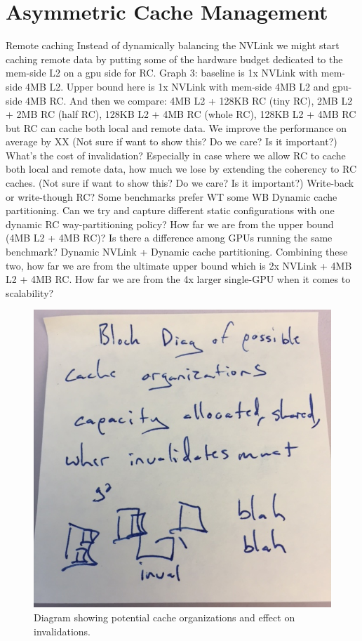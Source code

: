 \section{Asymmetric Cache Management}

Remote caching
Instead of dynamically balancing the NVLink we might start caching remote data by putting some of the hardware budget dedicated to the mem-side L2 on a gpu side for RC. 
Graph 3: baseline is 1x NVLink with mem-side 4MB L2. Upper bound here is 1x NVLink with mem-side 4MB L2 and gpu-side 4MB RC. And then we compare: 4MB L2 + 128KB RC (tiny RC), 2MB L2 + 2MB RC (half RC), 128KB L2 + 4MB RC (whole RC), 128KB L2 + 4MB RC but RC can cache both local and remote data. We improve the performance on average by XX%
(Not sure if want to show this? Do we care? Is it important?) What’s the cost of invalidation? Especially in case where we allow RC to cache both local and remote data, how much we lose by extending the coherency to RC caches. 
(Not sure if want to show this? Do we care? Is it important?) Write-back or write-though RC? Some benchmarks prefer WT some WB
Dynamic cache partitioning. Can we try and capture different static configurations with one dynamic RC way-partitioning policy? How far we are from the upper bound (4MB L2 + 4MB RC)? Is there a difference among GPUs running the same benchmark? 
Dynamic NVLink + Dynamic cache partitioning. Combining these two, how far we are from the ultimate upper bound which is 2x NVLink + 4MB L2 + 4MB RC. How far we are from the 4x larger single-GPU when it comes to scalability?

\begin{figure}[tp]
    \centering
    \includegraphics[width=0.9\columnwidth]{figures/cacheorg.jpg}
    \caption{Diagram showing potential cache organizations and effect on invalidations.}
    \label{fig:cacheorg}
\end{figure}



